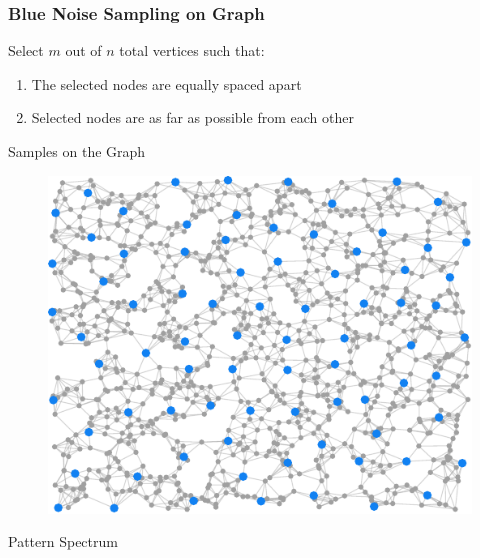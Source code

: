 \documentclass[11pts]{beamer}
\begin{document}

\begin{frame}%
\frametitle{Blue Noise Sampling on Graph}


Select $m$ out of $n$ total vertices such that:

\begin{enumerate}
    \item The selected  nodes are equally spaced apart
    \item  Selected nodes are as far as possible from each other
\end{enumerate}

\begin{minipage}{0.5\textwidth}
\centering
Samples on the Graph
\begin{figure}
    \centering
 \includegraphics[scale=0.5]{IM/Samplig_RAND_BN.pdf}
\end{figure}
    \end{minipage}
    \hfill
    \begin{minipage}{0.45\textwidth}
    \vspace*{0.5cm}
    \centering
   Pattern Spectrum
  \begin{figure}
     \centering

\end{figure}
\end{minipage}
\end{frame}
\end{document}
